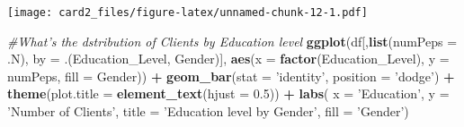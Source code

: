 \documentclass[]{article}
\newenvironment{Shaded}{\begin{snugshade}}{\end{snugshade}}
\newcommand{\CommentTok}[1]{\textcolor[rgb]{0.56,0.35,0.01}{\textit{#1}}}
\newcommand{\DataTypeTok}[1]{\textcolor[rgb]{0.13,0.29,0.53}{#1}}
\newcommand{\DecValTok}[1]{\textcolor[rgb]{0.00,0.00,0.81}{#1}}
\newcommand{\FloatTok}[1]{\textcolor[rgb]{0.00,0.00,0.81}{#1}}
\newcommand{\KeywordTok}[1]{\textcolor[rgb]{0.13,0.29,0.53}{\textbf{#1}}}
\newcommand{\NormalTok}[1]{#1}
\newcommand{\OperatorTok}[1]{\textcolor[rgb]{0.81,0.36,0.00}{\textbf{#1}}}
\newcommand{\StringTok}[1]{\textcolor[rgb]{0.31,0.60,0.02}{#1}}
\begin{document}
\begin{Shaded}
\end{Shaded}

\texttt{[image: card2\_files/figure-latex/unnamed-chunk-12-1.pdf]}

\begin{Shaded}
\begin{Highlighting}[]
\CommentTok{#What's the dstribution of Clients by Education level}
\KeywordTok{ggplot}\NormalTok{(df[,}\KeywordTok{list}\NormalTok{(}\DataTypeTok{numPeps =}\NormalTok{ .N), }\DataTypeTok{by =}\NormalTok{ .(Education_Level, Gender)], }\KeywordTok{aes}\NormalTok{(}\DataTypeTok{x =} \KeywordTok{factor}\NormalTok{(Education_Level), }\DataTypeTok{y =}\NormalTok{ numPeps, }\DataTypeTok{fill =}\NormalTok{ Gender)) }\OperatorTok{+}
\StringTok{  }\KeywordTok{geom_bar}\NormalTok{(}\DataTypeTok{stat =} \StringTok{'identity'}\NormalTok{, }\DataTypeTok{position =} \StringTok{'dodge'}\NormalTok{) }\OperatorTok{+}\StringTok{ }\KeywordTok{theme}\NormalTok{(}\DataTypeTok{plot.title =} \KeywordTok{element_text}\NormalTok{(}\DataTypeTok{hjust =} \FloatTok{0.5}\NormalTok{)) }\OperatorTok{+}
\StringTok{  }\KeywordTok{labs}\NormalTok{( }\DataTypeTok{x =} \StringTok{'Education'}\NormalTok{, }\DataTypeTok{y =} \StringTok{'Number of Clients'}\NormalTok{, }\DataTypeTok{title =} \StringTok{'Education level  by Gender'}\NormalTok{, }\DataTypeTok{fill =} \StringTok{'Gender'}\NormalTok{)}
\end{Highlighting}
\end{Shaded}
\end{document}
